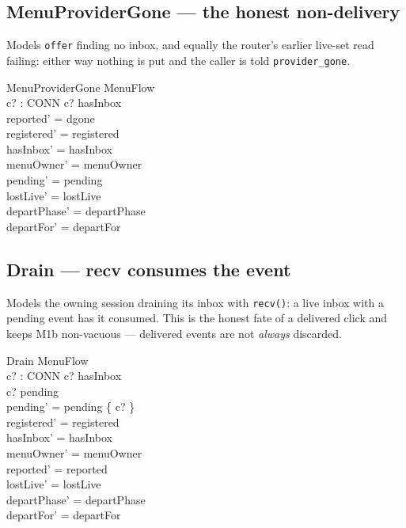 \documentclass[a4paper,10pt,fleqn]{article}
\begin{document}
\subsection{MenuProviderGone --- the honest non-delivery}

Models \texttt{offer} finding no inbox, and equally the router's earlier
live-set read failing: either way nothing is put and the caller is told
\texttt{provider\_gone}.

\begin{schema}{MenuProviderGone}
  \Delta MenuFlow \\
  c? : CONN
\where
  c? \notin hasInbox \\
  reported' = dgone \\
  registered' = registered \\
  hasInbox' = hasInbox \\
  menuOwner' = menuOwner \\
  pending' = pending \\
  lostLive' = lostLive \\
  departPhase' = departPhase \\
  departFor' = departFor
\end{schema}

\subsection{Drain --- recv consumes the event}

Models the owning session draining its inbox with \texttt{recv()}: a live inbox
with a pending event has it consumed. This is the honest fate of a delivered
click and keeps M1b non-vacuous --- delivered events are not \emph{always}
discarded.

\begin{schema}{Drain}
  \Delta MenuFlow \\
  c? : CONN
\where
  c? \in hasInbox \\
  c? \in pending \\
  pending' = pending \setminus \{ c? \} \\
  registered' = registered \\
  hasInbox' = hasInbox \\
  menuOwner' = menuOwner \\
  reported' = reported \\
  lostLive' = lostLive \\
  departPhase' = departPhase \\
  departFor' = departFor
\end{schema}
\end{document}
